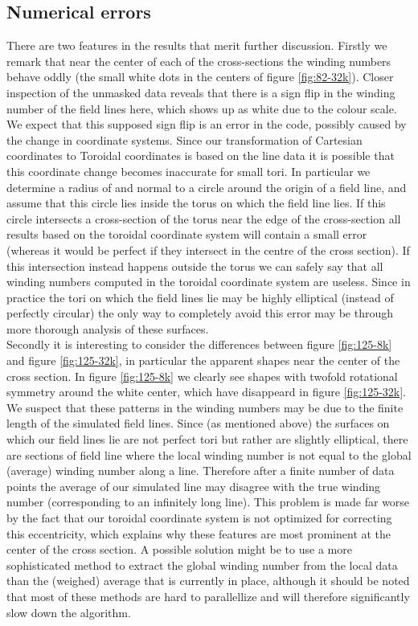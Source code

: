 \documentclass{article}
\begin{document}
\subsection{Numerical errors}
There are two features in the results that merit further discussion. Firstly we remark that near the center of each of the cross-sections the winding numbers behave oddly (the small white dots in the centers of figure \ref{fig:82-32k}).
Closer inspection of the unmasked data reveals that there is a sign flip in the winding number of the field lines here, which shows up as white due to the colour scale. 
We expect that this supposed sign flip is an error in the code, possibly caused by the change in coordinate systems. 
Since our transformation of Cartesian coordinates to Toroidal coordinates is based on the line data it is possible that this coordinate change becomes inaccurate for small tori. 
In particular we determine a radius of and normal to a circle around the origin of a field line, and assume that this circle lies inside the torus on which the field line lies. If this circle intersects a cross-section of the torus near the edge of the cross-section all results based on the toroidal coordinate system will contain a small error (whereas it would be perfect if they intersect in the centre of the cross section). 
If this intersection instead happens outside the torus we can safely say that all winding numbers computed in the toroidal coordinate system are useless. 
Since in practice the tori on which the field lines lie may be highly elliptical (instead of perfectly circular) the only way to completely avoid this error may be through more thorough analysis of these surfaces.\\

Secondly it is interesting to consider the differences between figure \ref{fig:125-8k} and figure \ref{fig:125-32k}, in particular the apparent shapes near the center of the cross section. 
In figure \ref{fig:125-8k} we clearly see shapes with twofold rotational symmetry around the white center, which have disappeard in figure \ref{fig:125-32k}.
We suspect that these patterns in the winding numbers may be due to the finite length of the simulated field lines. 
Since (as mentioned above) the surfaces on which our field lines lie are not perfect tori but rather are slightly elliptical, there are sections of field line where the local winding number is not equal to the global (average) winding number along a line. 
Therefore after a finite number of data points the average of our simulated line may disagree with the true winding number (corresponding to an infinitely long line). 
This problem is made far worse by the fact that our toroidal coordinate system is not optimized for correcting this eccentricity, which explains why these features are most prominent at the center of the cross section. 
A possible solution might be to use a more sophisticated method to extract the global winding number from the local data than the (weighed) average that is currently in place, although it should be noted that most of these methods are hard to parallellize and will therefore significantly slow down the algorithm.\\
\end{document}
